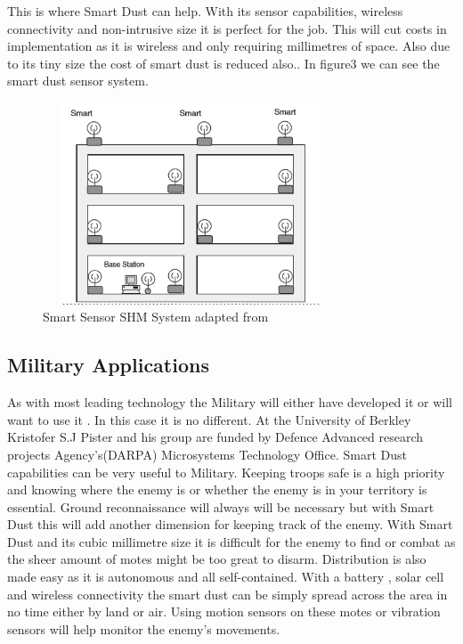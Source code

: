 \documentclass[article]{IEEEtran}
\begin{document}
This is where Smart Dust can help. With its sensor capabilities, wireless connectivity and non-intrusive size it is perfect for the job. This will cut costs in implementation as it is wireless and only requiring millimetres of space. Also due to its tiny size the cost of smart dust is reduced also.\cite{SHM}. In figure3 we can see the smart dust sensor system.

\begin{figure}[h!]
\graphicspath{ {images/} }
\includegraphics[width=8.8cm, height=6cm]{figure3}
\caption{Smart Sensor SHM System adapted from \cite{SHM}}
\end{figure}

\subsection{Military Applications}

As with most leading technology the Military will either have developed it or will want to use it . In this case it is no different. At the University of Berkley Kristofer S.J Pister and his group are funded by Defence Advanced research projects Agency’s(DARPA) Microsystems Technology Office\cite{Mili}. Smart Dust capabilities can be very useful to Military. Keeping troops safe is a high priority and knowing where the enemy is or whether the enemy is in your territory is essential.
Ground reconnaissance will always will be necessary but with Smart Dust this will add another dimension for keeping track of the enemy.  With Smart Dust and its cubic millimetre size it is difficult for the enemy to find or combat as the sheer amount of motes might be too great to disarm. Distribution is also made easy as it is autonomous and all self-contained. With a battery , solar cell and wireless connectivity the smart dust can be simply spread across the area in no time either by land or air\cite{Lightweight}. Using motion sensors on these motes or vibration sensors will help monitor the enemy’s movements\cite{friendorfoe}.
\end{document}
